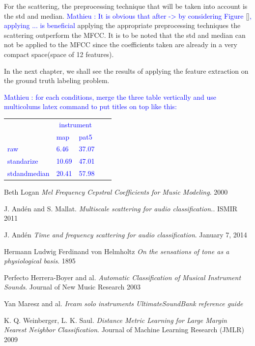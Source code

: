 \documentclass[hidelinks,12pt]{report}
\newcommand{\ml}[1]{\textcolor{blue}{ Mathieu : #1}}
\begin{document}
For the scattering, the preprocessing technique that will be taken into account is the std and median. \ml{It is obvious that after -> by considering Figure \ref{}, applying ... is beneficial} applying the appropriate preprocessing techniques the scattering outperform the MFCC. It is to be noted that the std and median can not be applied to the MFCC since the coefficients taken are already in a very compact space(space of 12 features). \par
In the next chapter, we shall see the results of applying the feature extraction on the ground truth labeling problem.

\ml{for each conditions, merge the three table vertically and use multicolums latex command to put titles on top like this:
\begin{tabular}{ l l | l | l | l | }
 & \multicolumn{2}{c}{instrument}  \\ 
 & map & pat5  \\ 
\hline 
raw &  6.46 & 37.07  \\ 
standarize & 10.69 & 47.01  \\ 
stdandmedian & 20.41 & 57.98  \\ 
\end{tabular}
}

\newpage
\begin{thebibliography}{2}
Beth Logan
\textit{Mel Frequency Cepstral Coefficients for Music Modeling}. 
2000

J. Andén and S. Mallat. 
\textit{Multiscale scattering for audio classification.}. 
ISMIR 2011

J. Andén 
\textit{Time and frequency scattering for audio classification}. 
January 7, 2014

Hermann Ludwig Ferdinand von Helmholtz
\textit{On the sensations of tone as a physiological basis}.
1895


Perfecto Herrera-Boyer and al.
\textit{Automatic Classification of Musical Instrument Sounds}.
Journal of New Music Research 2003


Yan Maresz and al.
\textit{Ircam solo instruments UltimateSoundBank reference guide}

K. Q. Weinberger, L. K. Saul. 
\textit{Distance Metric Learning for Large Margin Nearest Neighbor Classification}.
Journal of Machine Learning Research (JMLR) 2009



\end{thebibliography}
\end{document}
